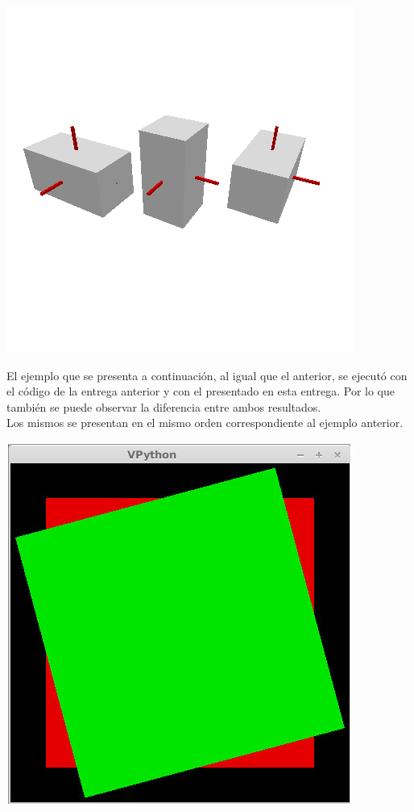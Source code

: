 \centerline{\includegraphics[scale=0.40]{../imagenes/eg04_nuevo.png}}


El ejemplo que se presenta a continuaci\'on, al igual que el anterior, se ejecut\'o con el c\'odigo de la entrega anterior y con el presentado en esta entrega. Por lo que tambi\'en se puede observar la diferencia entre ambos resultados.\\
Los mismos se presentan en el mismo orden correspondiente al ejemplo anterior.\\




\centerline{\includegraphics[scale=0.40]{../imagenes/eg11.jpg}}



